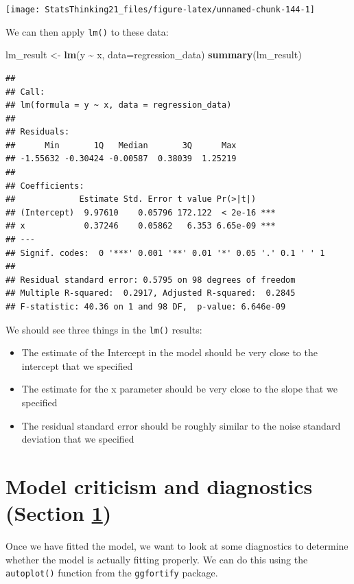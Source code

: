 \documentclass[
  12pt,
]{book}
\newenvironment{Shaded}{\begin{snugshade}}{\end{snugshade}}
\newcommand{\AttributeTok}[1]{\textcolor[rgb]{0.13,0.29,0.53}{#1}}
\newcommand{\FunctionTok}[1]{\textcolor[rgb]{0.13,0.29,0.53}{\textbf{#1}}}
\newcommand{\NormalTok}[1]{#1}
\newcommand{\OtherTok}[1]{\textcolor[rgb]{0.56,0.35,0.01}{#1}}
\newcommand{\SpecialCharTok}[1]{\textcolor[rgb]{0.81,0.36,0.00}{\textbf{#1}}}
\providecommand{\tightlist}{%
  \setlength{\itemsep}{0pt}\setlength{\parskip}{0pt}}
\begin{document}
\texttt{[image: StatsThinking21\_files/figure-latex/unnamed-chunk-144-1]}

We can then apply \texttt{lm()} to these data:

\begin{Shaded}
\begin{Highlighting}[]
\NormalTok{lm\_result }\OtherTok{\textless{}{-}} \FunctionTok{lm}\NormalTok{(y }\SpecialCharTok{\textasciitilde{}}\NormalTok{ x, }\AttributeTok{data=}\NormalTok{regression\_data)}
\FunctionTok{summary}\NormalTok{(lm\_result)}
\end{Highlighting}
\end{Shaded}

\begin{verbatim}
## 
## Call:
## lm(formula = y ~ x, data = regression_data)
## 
## Residuals:
##      Min       1Q   Median       3Q      Max 
## -1.55632 -0.30424 -0.00587  0.38039  1.25219 
## 
## Coefficients:
##             Estimate Std. Error t value Pr(>|t|)    
## (Intercept)  9.97610    0.05796 172.122  < 2e-16 ***
## x            0.37246    0.05862   6.353 6.65e-09 ***
## ---
## Signif. codes:  0 '***' 0.001 '**' 0.01 '*' 0.05 '.' 0.1 ' ' 1
## 
## Residual standard error: 0.5795 on 98 degrees of freedom
## Multiple R-squared:  0.2917, Adjusted R-squared:  0.2845 
## F-statistic: 40.36 on 1 and 98 DF,  p-value: 6.646e-09
\end{verbatim}

We should see three things in the \texttt{lm()} results:

\begin{itemize}
\tightlist
\item
  The estimate of the Intercept in the model should be very close to the intercept that we specified
\item
  The estimate for the x parameter should be very close to the slope that we specified
\item
  The residual standard error should be roughly similar to the noise standard deviation that we specified
\end{itemize}

\hypertarget{model-criticism}{%
\section{Model criticism and diagnostics (Section \ref{model-criticism})}\label{model-criticism}}

Once we have fitted the model, we want to look at some diagnostics to determine whether the model is actually fitting properly. We can do this using the \texttt{autoplot()} function from the \texttt{ggfortify} package.
\end{document}
